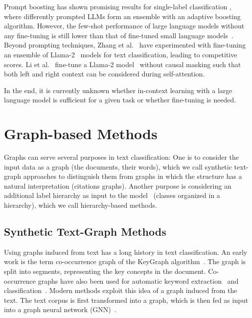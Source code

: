 \documentclass[lettersize,journal]{IEEEtran}
\begin{document}
Prompt boosting has shown promising results for single-label classification
\cite{pmlr-v202-hou23b}, where differently prompted LLMs form an ensemble with an adaptive boosting algorithm. 
However, the few-shot performance of large language models without any fine-tuning is still lower than that of fine-tuned small language models~\cite{edwards2024language}.
Beyond prompting techniques,
Zhang et al.~\cite{pushing-the-limit-11346014-rgpt} have experimented with fine-tuning an ensemble of Llama-2~\cite{touvronLlamaOpenFoundation2023} models for text classification, leading to competitive scores.
Li et al.~\cite{li2023label} fine-tune a Llama-2 model~\cite{touvronLlamaOpenFoundation2023} without causal masking such that both left and right context can be considered during self-attention. 

In the end, it is currently unknown whether in-context learning with a large language model is sufficient for a given task or whether fine-tuning is needed. 

\section{Graph-based Methods}\label{sec:graph}

Graphs can serve several purposes in text classification: One is to consider the input data as a graph (\ie the documents, their words), which we call synthetic text-graph approaches to distinguish them from graphs in which the structure has a natural interpretation (\eg citations graphs). Another purpose is considering an additional label hierarchy as input to the model~\cite{DBLP:journals/csur/Sebastiani02} (\ie classes organized in a hierarchy), which we call hierarchy-based methods.

\subsection{Synthetic Text-Graph Methods}

Using graphs induced from text has a long history in text classification. 
An early work is the term co-occurrence graph of the KeyGraph algorithm~\cite{DBLP:conf/adl/OhsawaBY98}.
The graph is split into segments, representing the key concepts in the document.
Co-occurrence graphs have also been used for automatic keyword extraction~\cite{Rose2010} and classification~\cite{DBLP:conf/emnlp/ZhangDXLZ21}.
Modern methods exploit this idea of a graph induced from the text.
The text corpus is first transformed into a graph, which is then fed as input into a graph neural network (GNN)~\cite{book:hamilton:grl}.
\end{document}

